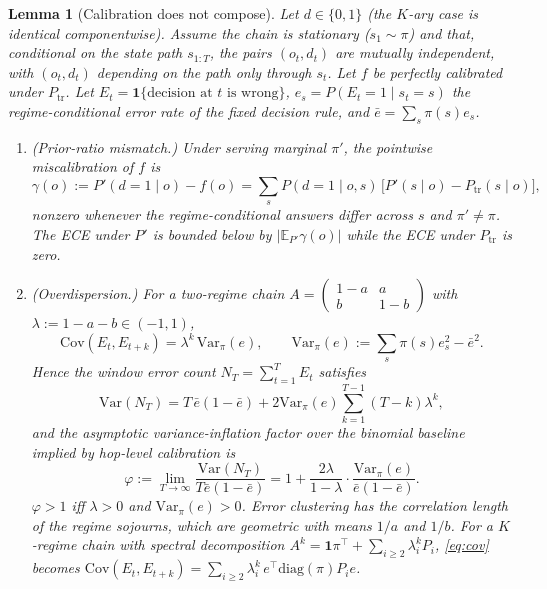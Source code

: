 \documentclass[11pt,a4paper]{article}
\numberwithin{equation}{section}
\theoremstyle{plain}
\newtheorem{lemma}{Lemma}
\theoremstyle{definition}
\theoremstyle{remark}
\newcommand{\E}{\mathbb{E}}
\newcommand{\Var}{\mathrm{Var}}
\newcommand{\Cov}{\mathrm{Cov}}
\newcommand{\ind}[1]{\mathbf{1}\{#1\}}
\newcommand{\ptrain}{P_{\mathrm{tr}}}
\begin{document}
\begin{lemma}[Calibration does not compose]\label{lem:compose}
Let $d\in\{0,1\}$ (the $K$-ary case is identical componentwise). Assume the chain is stationary ($s_1\sim\pi$) and that, conditional on the state path $s_{1:T}$, the pairs $(o_t,d_t)$ are mutually independent, with $(o_t,d_t)$ depending on the path only through $s_t$. Let $f$ be perfectly calibrated under $\ptrain$. Let $E_t = \ind{\text{decision at } t \text{ is wrong}}$, $e_s = P(E_t=1\mid s_t=s)$ the regime-conditional error rate of the fixed decision rule, and $\bar e = \sum_s \pi(s)e_s$.
\begin{enumerate}[label=(\roman*),leftmargin=2em]
\item \textup{(Prior-ratio mismatch.)} Under serving marginal $\pi'$, the pointwise miscalibration of $f$ is
\begin{equation}\label{eq:delta}
\gamma(o) := P'(d=1\mid o) - f(o) = \sum_s P(d=1\mid o,s)\,\bigl[P'(s\mid o) - \ptrain(s\mid o)\bigr],
\end{equation}
nonzero whenever the regime-conditional answers differ across $s$ and $\pi'\neq\pi$. The ECE under $P'$ is bounded below by $|\E_{P'}\gamma(o)|$ while the ECE under $\ptrain$ is zero.
\item \textup{(Overdispersion.)} For a two-regime chain $A = \begin{pmatrix}1-a & a\\ b & 1-b\end{pmatrix}$ with $\lambda := 1-a-b\in(-1,1)$,
\begin{equation}\label{eq:cov}
\Cov(E_t,E_{t+k}) = \lambda^k\,\Var_\pi(e),\qquad \Var_\pi(e) := \sum_s\pi(s)e_s^2 - \bar e^2 .
\end{equation}
Hence the window error count $N_T = \sum_{t=1}^T E_t$ satisfies
\begin{equation}\label{eq:varN}
\Var(N_T) = T\,\bar e(1-\bar e) + 2\Var_\pi(e)\sum_{k=1}^{T-1}(T-k)\lambda^k,
\end{equation}
and the asymptotic variance-inflation factor over the binomial baseline implied by hop-level calibration is
\begin{equation}\label{eq:phi}
\varphi := \lim_{T\to\infty}\frac{\Var(N_T)}{T\bar e(1-\bar e)} = 1 + \frac{2\lambda}{1-\lambda}\cdot\frac{\Var_\pi(e)}{\bar e(1-\bar e)} .
\end{equation}
$\varphi>1$ iff $\lambda>0$ and $\Var_\pi(e)>0$. Error clustering has the correlation length of the regime sojourns, which are geometric with means $1/a$ and $1/b$. For a $K$-regime chain with spectral decomposition $A^k = \mathbf 1\pi^\top + \sum_{i\ge2}\lambda_i^k P_i$, \eqref{eq:cov} becomes $\Cov(E_t,E_{t+k}) = \sum_{i\ge 2}\lambda_i^k\, e^\top\mathrm{diag}(\pi)P_i e$.

\end{enumerate}
\end{lemma}
\end{document}
